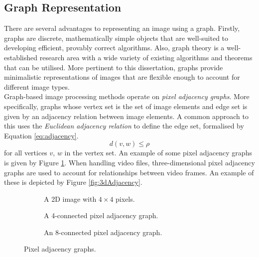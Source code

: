 \subsection{Graph Representation}
\label{sec:graphReps}
\setlength{\leftskip}{0.5cm}
\indent \indent
There are several advantages to representing an image using a graph. Firstly, graphs are discrete, mathematically simple objects that are well-suited to developing efficient, provably correct algorithms. Also, graph theory is a well-established research area with a wide variety of existing algorithms and theorems that can be utilised. More pertinent to this dissertation, graphs provide minimalistic representations of images that are flexible enough to account for different image types.
\smallskip \\ \indent
Graph-based image processing methods operate on \textit{pixel adjacency graphs}. More specifically, graphs whose vertex set is the set of image elements and edge set is given by an adjacency relation between image elements. A common approach to this uses the \textit{Euclidean adjacency relation} to define the edge set, formalised by Equation \ref{eq:adjacency}.
\begin{equation}
    d(v, w) \leq \rho
\end{equation}
for all vertices $v$, $w$ in the vertex set.  An example of some pixel adjacency graphs is given by Figure \ref{fig:pixelAdjacency}. When handling video files, three-dimensional pixel adjacency graphs are used to account for relationships between video frames. An example of these is depicted by Figure \ref{fig:3dAdjacency}.
\begin{figure}[htp]
    \centering
    \begin{subfigure}[b]{0.29\textwidth}
        \centering
        \captionsetup{justification=centering}
        \scalebox{1}{}
        \caption{A 2D image with $4 \times 4$ pixels.}
    \end{subfigure} \hfill%
    \begin{subfigure}[b]{0.29\textwidth}
        \centering
        \captionsetup{justification=centering}
        \scalebox{1}{}
        \caption{A 4-connected pixel adjacency graph.}
    \end{subfigure} \hfill%
    \begin{subfigure}[b]{0.29\textwidth}
        \centering
        \captionsetup{justification=centering}
        \scalebox{1}{}
        \caption{An 8-connected pixel adjacency graph.}
    \end{subfigure}%
    \caption[Pixel Adjacency Graphs]{Pixel adjacency graphs.}
    \label{fig:pixelAdjacency}
\end{figure}
